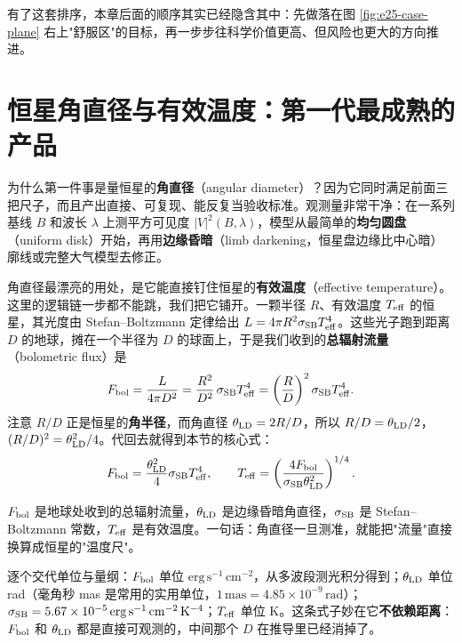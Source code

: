 有了这套排序，本章后面的顺序其实已经隐含其中：先做落在图 \ref{fig:e25-case-plane} 右上"舒服区"的目标，再一步步往科学价值更高、但风险也更大的方向推进。

\section{恒星角直径与有效温度：第一代最成熟的产品}
\label{sec:e25-diameter}

为什么第一件事是量恒星的\textbf{角直径}（angular diameter）？因为它同时满足前面三把尺子，而且产出直接、可复现、能反复当验收标准。观测量非常干净：在一系列基线 \(B\) 和波长 \(\lambda\) 上测平方可见度 \(|V|^2(B,\lambda)\)，模型从最简单的\textbf{均匀圆盘}（uniform disk）开始，再用\textbf{边缘昏暗}（limb darkening，恒星盘边缘比中心暗）廓线或完整大气模型去修正。

角直径最漂亮的用处，是它能直接钉住恒星的\textbf{有效温度}（effective temperature）。这里的逻辑链一步都不能跳，我们把它铺开。一颗半径 \(R\)、有效温度 \(T_{\rm eff}\) 的恒星，其光度由 Stefan--Boltzmann 定律给出 \(L=4\pi R^2\sigma_{\rm SB}T_{\rm eff}^4\)。这些光子跑到距离 \(D\) 的地球，摊在一个半径为 \(D\) 的球面上，于是我们收到的\textbf{总辐射流量}（bolometric flux）是
\[
  F_{\rm bol}=\frac{L}{4\pi D^2}
  =\frac{R^2}{D^2}\,\sigma_{\rm SB}T_{\rm eff}^4
  =\left(\frac{R}{D}\right)^2\sigma_{\rm SB}T_{\rm eff}^4 .
\]
注意 \(R/D\) 正是恒星的\textbf{角半径}，而角直径 \(\theta_{\rm LD}=2R/D\)，所以 \(R/D=\theta_{\rm LD}/2\)，\((R/D)^2=\theta_{\rm LD}^2/4\)。代回去就得到本节的核心式：
\begin{equation}
  F_{\rm bol}
  =
  \frac{\theta_{\rm LD}^2}{4}
  \sigma_{\rm SB}T_{\rm eff}^4,
  \qquad
  T_{\rm eff}
  =
  \left(
  \frac{4F_{\rm bol}}
  {\sigma_{\rm SB}\theta_{\rm LD}^2}
  \right)^{1/4}.
  \label{eq:e25-teff}
\end{equation}
\begin{formulaexplain}
\(F_{\rm bol}\) 是地球处收到的总辐射流量，\(\theta_{\rm LD}\) 是边缘昏暗角直径，\(\sigma_{\rm SB}\) 是 Stefan--Boltzmann 常数，\(T_{\rm eff}\) 是有效温度。一句话：角直径一旦测准，就能把"流量"直接换算成恒星的"温度尺"。
\end{formulaexplain}
逐个交代单位与量纲：\(F_{\rm bol}\) 单位 \(\mathrm{erg\,s^{-1}\,cm^{-2}}\)，从多波段测光积分得到；\(\theta_{\rm LD}\) 单位 rad（毫角秒 mas 是常用的实用单位，\(1\,\mathrm{mas}=4.85\times10^{-9}\,\mathrm{rad}\)）；\(\sigma_{\rm SB}=5.67\times10^{-5}\,\mathrm{erg\,s^{-1}\,cm^{-2}\,K^{-4}}\)；\(T_{\rm eff}\) 单位 K。这条式子妙在它\textbf{不依赖距离}：\(F_{\rm bol}\) 和 \(\theta_{\rm LD}\) 都是直接可观测的，中间那个 \(D\) 在推导里已经消掉了。

